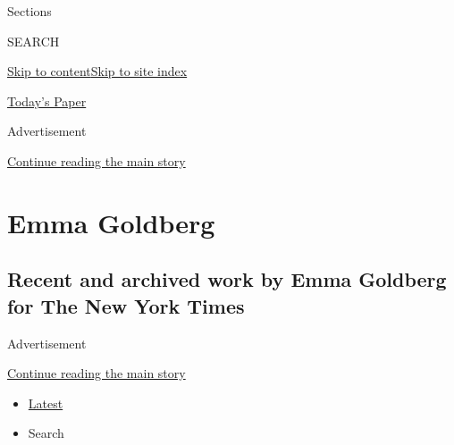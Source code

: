 Sections

SEARCH

\protect\hyperlink{site-content}{Skip to
content}\protect\hyperlink{site-index}{Skip to site index}

\href{https://myaccount.nytimes3xbfgragh.onion/auth/login?response_type=cookie\&client_id=vi}{}

\href{https://www.nytimes3xbfgragh.onion/section/todayspaper}{Today's
Paper}

Advertisement

\protect\hyperlink{after-top}{Continue reading the main story}

\hypertarget{emma-goldberg}{%
\section{Emma Goldberg}\label{emma-goldberg}}

\hypertarget{recent-and-archived-work-by-emma-goldberg-for-the-new-york-times}{%
\subsection{Recent and archived work by Emma Goldberg for The New York
Times}\label{recent-and-archived-work-by-emma-goldberg-for-the-new-york-times}}

Advertisement

\protect\hyperlink{after-mid1}{Continue reading the main story}

\begin{itemize}
\tightlist
\item
  \protect\hyperlink{stream-panel}{Latest}
\item
  Search
\end{itemize}

